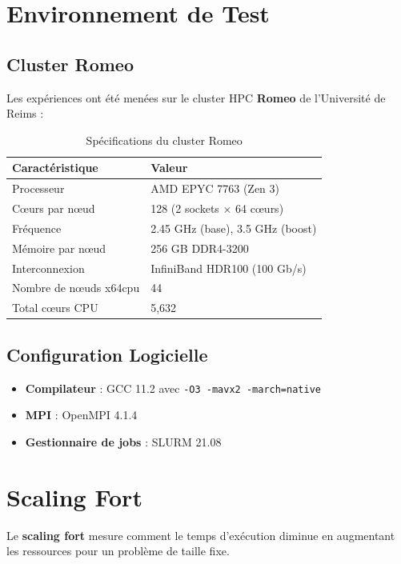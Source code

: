 \documentclass[12pt,a4paper,twoside]{report}
\begin{document}
\section{Environnement de Test}

\subsection{Cluster Romeo}

Les expériences ont été menées sur le cluster HPC \textbf{Romeo} de l'Université de Reims :

\begin{table}[htbp]
\centering
\caption{Spécifications du cluster Romeo}
\label{tab:romeo-specs}
\begin{tabular}{@{}ll@{}}
\toprule
\textbf{Caractéristique} & \textbf{Valeur} \\
\midrule
Processeur & AMD EPYC 7763 (Zen 3) \\
Cœurs par nœud & 128 (2 sockets × 64 cœurs) \\
Fréquence & 2.45 GHz (base), 3.5 GHz (boost) \\
Mémoire par nœud & 256 GB DDR4-3200 \\
Interconnexion & InfiniBand HDR100 (100 Gb/s) \\
Nombre de nœuds x64cpu & 44 \\
Total cœurs CPU & 5,632 \\
\bottomrule
\end{tabular}
\end{table}

\subsection{Configuration Logicielle}

\begin{itemize}
    \item \textbf{Compilateur} : GCC 11.2 avec \texttt{-O3 -mavx2 -march=native}
    \item \textbf{MPI} : OpenMPI 4.1.4
    \item \textbf{Gestionnaire de jobs} : SLURM 21.08
\end{itemize}

\section{Scaling Fort}

Le \textbf{scaling fort} mesure comment le temps d'exécution diminue en augmentant les ressources pour un problème de taille fixe.
\end{document}
